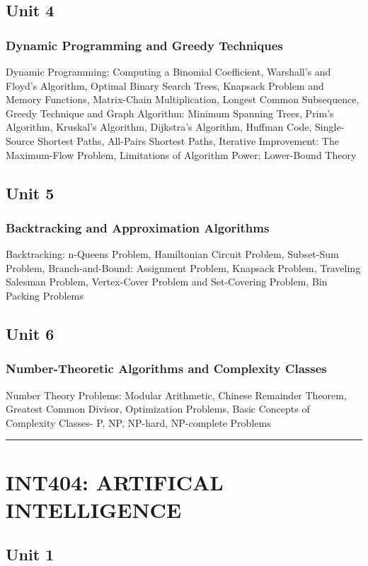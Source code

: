 \documentclass{article}
\begin{document}
\begin{multicols*}{2}
    \subsection*{Unit 4}
    \subsubsection*{Dynamic Programming and Greedy Techniques}
    Dynamic Programming: Computing a Binomial
    Coefficient, Warshall's and Floyd's Algorithm, Optimal Binary Search Trees, Knapsack Problem and
    Memory Functions, Matrix-Chain Multiplication, Longest Common Subsequence, Greedy Technique
    and Graph Algorithm: Minimum Spanning Trees, Prim's Algorithm, Kruskal's Algorithm, Dijkstra's
    Algorithm, Huffman Code, Single-Source Shortest Paths, All-Pairs Shortest Paths, Iterative
    Improvement: The Maximum-Flow Problem, Limitations of Algorithm Power: Lower-Bound Theory
    \subsection*{Unit 5}
    \subsubsection*{Backtracking and Approximation Algorithms}
    Backtracking: n-Queens Problem, Hamiltonian Circuit Problem, Subset-Sum Problem, Branch-and-Bound: Assignment Problem, Knapsack Problem, Traveling Salesman Problem, Vertex-Cover Problem and Set-Covering Problem, Bin Packing Problems
    \subsection*{Unit 6}
    \subsubsection*{Number-Theoretic Algorithms and Complexity Classes}
    Number Theory Problems: Modular Arithmetic, Chinese Remainder Theorem, Greatest Common Divisor, Optimization Problems, Basic Concepts of Complexity Classes- P, NP, NP-hard, NP-complete Problems\\
    \hrule
    \section*{INT404: ARTIFICAL INTELLIGENCE}
    \subsection*{Unit 1}

\end{multicols*}
\end{document}
